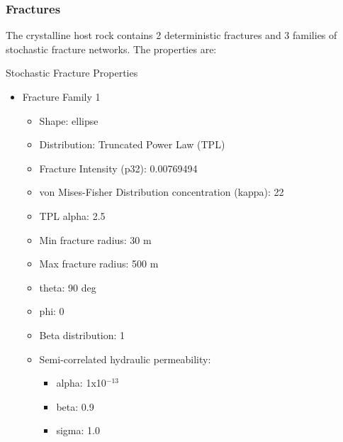 \documentclass{beamer}
\begin{document}
\begin{frame}\frametitle{Fractures}
	
	The crystalline host rock contains 2 deterministic fractures and 3 families of stochastic fracture networks. The properties are:
	
	Stochastic Fracture Properties
	\begin{itemize}
		\item Fracture Family 1
		\begin{itemize}
			\item Shape: ellipse
			\item Distribution: Truncated Power Law (TPL)
			\item Fracture Intensity (p32): 0.00769494
			\item von Mises-Fisher Distribution concentration (kappa): 22
			\item TPL alpha: 2.5
			\item Min fracture radius: 30 m
			\item Max fracture radius: 500 m
			\item theta: 90 deg
			\item phi: 0
			\item Beta distribution: 1
			\item Semi-correlated hydraulic permeability:
			\begin{itemize}
				\item alpha: 1x10$^{-13}$
				\item beta: 0.9
				\item sigma: 1.0
			\end{itemize}
		\end{itemize}
	\end{itemize}
\end{frame}
	
\end{document}
